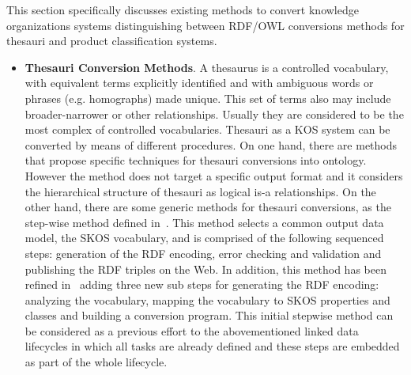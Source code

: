 This section specifically discusses existing methods to convert knowledge organizations systems distinguishing between RDF/OWL 
conversions methods for thesauri and product classification systems.

\begin{itemize}
 \item \textbf{Thesauri Conversion Methods}. A thesaurus is a controlled vocabulary, with equivalent terms explicitly 
 identified and with ambiguous words or phrases (e.g. homographs) made unique. This set of terms also may include broader-narrower 
 or other relationships. Usually they are considered to be the most complex of controlled vocabularies. Thesauri as a KOS 
 system can be converted by means of different procedures. On one hand, there are methods~\cite{DBLP:conf/jcdl/Soergel05} that propose specific 
 techniques for thesauri conversions into ontology. However the method does not target a specific output format and it considers the 
 hierarchical structure of thesauri as logical is-a relationships. On the other hand, there are some generic methods 
 for thesauri conversions, as the step-wise method defined in~\cite{DBLP:conf/esws/AssemMMS06}. This method selects a common output data model, the 
 SKOS vocabulary, and is comprised of the following sequenced steps: generation of the RDF encoding, error checking and validation 
 and publishing the RDF triples on the Web. In addition, this method has been refined in~\cite{siedl2008} adding three new sub steps 
 for generating the RDF encoding: analyzing the vocabulary, mapping the vocabulary to SKOS properties and classes and building a conversion program. 
 This initial stepwise method can be considered as a previous effort to the abovementioned linked data lifecycles in which all tasks are already defined and these
 steps are embedded as part of the whole lifecycle.
 

\end{itemize}
